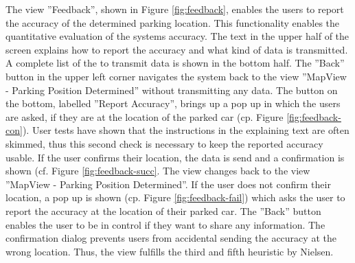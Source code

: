 The view ''Feedback'', shown in Figure \ref{fig:feedback}, enables the users to report the accuracy of the determined parking location. This functionality enables the quantitative evaluation of the systems accuracy. The text in the upper half of the screen explains how to report the accuracy and what kind of data is transmitted. A complete list of the to transmit data is shown in the bottom half. The ''Back'' button in the upper left corner navigates the system back to the view ''MapView - Parking Position Determined'' without transmitting any data. The button on the bottom, labelled ''Report Accuracy'', brings up a pop up in which the users are asked, if they are at the location of the parked car (cp. Figure \ref{fig:feedback-con}). User tests have shown that the instructions in the explaining text are often skimmed, thus this second check is necessary to keep the reported accuracy usable. If the user confirms their location, the data is send and a confirmation is shown (cf. Figure \ref{fig:feedback-succ}. The view changes back to the view ''MapView - Parking Position Determined''. If the user does not confirm their location, a pop up is shown (cp. Figure \ref{fig:feedback-fail}) which asks the user to report the accuracy at the location of their parked car. The ''Back'' button enables the user to be in control if they want to share any information. The confirmation dialog prevents users from accidental sending the accuracy at the wrong location. Thus, the view fulfills the third and fifth heuristic by Nielsen. \cite{nielsen1994usability}

